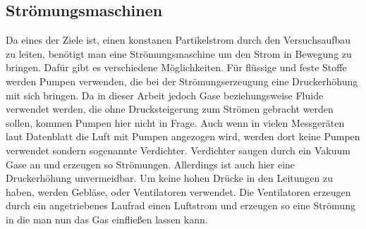 \subsection{Str\"{o}mungsmaschinen}
Da eines der Ziele ist, einen konstanen Partikelstrom durch den Versuchsaufbau zu leiten, ben\"{o}tigt man eine Str\"{o}mungsmaschine um den Strom in Bewegung zu bringen. Daf\"{u}r gibt es verschiedene M\"{o}glichkeiten. F\"{u}r fl\"{u}ssige und feste Stoffe werden Pumpen verwenden, die bei der Str\"{o}mungserzeugung eine Druckerh\"{o}hung mit sich bringen. Da in dieser Arbeit jedoch Gase beziehungsweise Fluide verwendet werden, die ohne Drucksteigerung zum Str\"{o}men gebracht werden sollen, kommen Pumpen hier nicht in Frage. Auch wenn in vielen Messger\"{a}ten laut Datenblatt die Luft mit Pumpen angezogen wird, werden dort keine Pumpen verwendet sondern sogenannte Verdichter. Verdichter saugen durch ein Vakuum Gase an und erzeugen so Str\"{o}mungen. Allerdings ist auch hier eine Druckerh\"{o}hung unvermeidbar. Um keine hohen Dr\"{u}cke in den Leitungen zu haben, werden Gebl\"{a}se, oder Ventilatoren verwendet. Die Ventilatoren erzeugen durch ein angetriebenes Laufrad einen Luftstrom und erzeugen so eine Str\"{o}mung in die man nun das Gas einflie{\ss}en lassen kann\cite{maschine}.